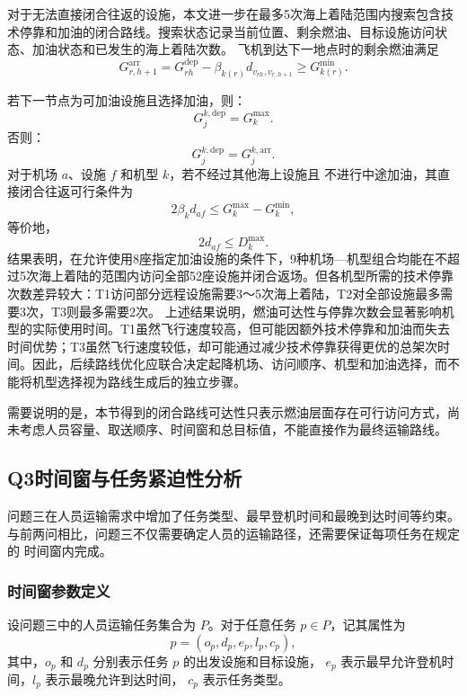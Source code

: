 \documentclass[UTF8,a4paper,zihao=5]{ctexart}
\begin{document}
对于无法直接闭合往返的设施，本文进一步在最多5次海上着陆范围内搜索包含技术停靠和加油的闭合路线。搜索状态记录当前位置、剩余燃油、目标设施访问状态、加油状态和已发生的海上着陆次数。
飞机到达下一地点时的剩余燃油满足
\begin{equation}
G_{r,h+1}^{\mathrm{arr}}
=
G_{rh}^{\mathrm{dep}}
-\beta_{k(r)}d_{v_{rh},v_{r,h+1}}
\ge G_{k(r)}^{\min}.
\end{equation}

若下一节点为可加油设施且选择加油，则：
\begin{equation}
  G_{j}^{k,\mathrm{dep}}=G_k^{\max}.
\end{equation}
否则：
\begin{equation}
  G_{j}^{k,\mathrm{dep}}=G_{j}^{k,\mathrm{arr}}.
\end{equation}
对于机场 $a$、设施 $f$ 和机型 $k$，若不经过其他海上设施且
不进行中途加油，其直接闭合往返可行条件为
\begin{equation}
2\beta_kd_{af}\le G_k^{\max}-G_k^{\min},
\end{equation}
等价地，
\begin{equation}
2d_{af}\le D_k^{\max}.
\end{equation}
结果表明，在允许使用8座指定加油设施的条件下，9种机场—机型组合均能在不超过5次海上着陆的范围内访问全部52座设施并闭合返场。但各机型所需的技术停靠次数差异较大：T1访问部分远程设施需要3～5次海上着陆，T2对全部设施最多需要3次，T3则最多需要2次。
上述结果说明，燃油可达性与停靠次数会显著影响机型的实际使用时间。T1虽然飞行速度较高，但可能因额外技术停靠和加油而失去时间优势；T3虽然飞行速度较低，却可能通过减少技术停靠获得更优的总架次时间。因此，后续路线优化应联合决定起降机场、访问顺序、机型和加油选择，而不能将机型选择视为路线生成后的独立步骤。

需要说明的是，本节得到的闭合路线可达性只表示燃油层面存在可行访问方式，尚未考虑人员容量、取送顺序、时间窗和总目标值，不能直接作为最终运输路线。
\subsection{Q3时间窗与任务紧迫性分析}
问题三在人员运输需求中增加了任务类型、最早登机时间和最晚到达时间等约束。
与前两问相比，问题三不仅需要确定人员的运输路径，还需要保证每项任务在规定的
时间窗内完成。

\subsubsection{时间窗参数定义}

设问题三中的人员运输任务集合为 $P$。对于任意任务
$p\in P$，记其属性为
\begin{equation}
    p=(o_p,d_p,e_p,l_p,c_p),
\end{equation}
其中，$o_p$ 和 $d_p$ 分别表示任务 $p$ 的出发设施和目标设施，
$e_p$ 表示最早允许登机时间，$l_p$ 表示最晚允许到达时间，
$c_p$ 表示任务类型。
\end{document}
